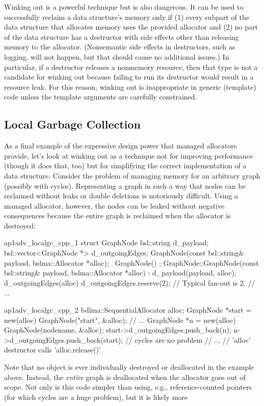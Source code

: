 Winking out is a powerful technique but is also dangerous. It can be used to
successfully reclaim a data structure’s memory only if (1) every subpart of the
data structure that allocates memory uses the provided allocator and (2) no
part of the data structure has a destructor with side effects other than
releasing memory to the allocator. (Nonsemantic side effects in destructors,
such as logging, will not happen, but that should cause no additional issues.)
In particular, if a destructor releases a nonmemory resource, then that type is
not a candidate for winking out because failing to run its destructor would
result in a resource leak. For this reason, winking out is inappropriate in
generic (template) code unless the template arguments are carefully
constrained.

\subsection{Local Garbage Collection}
As a final example of the expressive design power that managed allocators
provide, let’s look at winking out as a technique not for improving performance
(though it does that, too) but for simplifying the correct implementation of a
data structure. Consider the problem of managing memory for an arbitrary
graph (possibly with cycles). Representing a graph in such a way that nodes
can be reclaimed without leaks or double deletions is notoriously difficult.
Using a managed allocator, however, the nodes can be leaked without negative
consequences because the entire graph is reclaimed when the allocator is
destroyed:
\begin{cppcodeblock}{ap1adv_localgc_cpp_1}
    struct GraphNode {
        bsl::string d_payload;
        bsl::vector<GraphNode *> d_outgoingEdges;
        GraphNode(const bsl::string& payload, bslma::Allocator *alloc);
        ~GraphNode() { }
    };
    GraphNode::GraphNode(const bsl::string& payload, bslma::Allocator *alloc)
    : d_payload(payload, alloc), d_outgoingEdges(alloc) {
        d_outgoingEdges.reserve(2); // Typical fan-out is 2.
    }
    // ...
\end{cppcodeblock}
\begin{cppcodeblock}{ap1adv_localgc_cpp_2}
    {
        bdlma::SequentialAllocator alloc;
        GraphNode *start = new(alloc) GraphNode("start", &alloc);
        // ...
        GraphNode *n = new(alloc) GraphNode(nodename, &alloc);
            start->d_outgoingEdges.push_back(n);
        n->d_outgoingEdges.push_back(start); // cycles are no problem
        // ...
        // 'alloc' destructor calls 'alloc.release()'
    }
\end{cppcodeblock}
Note that no  object is ever individually destroyed or deallocated in
the example above. Instead, the \emph{entire} graph is deallocated when the allocator
goes out of scope. Not only is this code simpler than using, e.g.,
reference-counted pointers (for which cycles are a huge problem), but it is likely more


